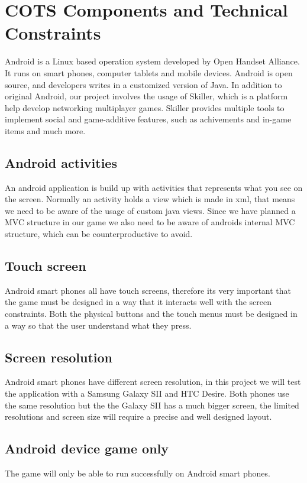 \section{COTS Components and Technical Constraints}
Android \cite{Android} is a Linux based operation system developed by Open Handset Alliance. It runs on smart phones, computer tablets and mobile devices. Android is open source, and developers writes in a customized version of Java\cite{sdk}. In addition to original Android, our project involves the usage of Skiller\cite{Skiller}, which is a platform help develop networking multiplayer games. Skiller provides multiple tools to implement social and game-additive features, such as achivements and in-game items and much more.

\subsection{Android activities}
An android application is build up with activities that represents what you see on the screen. Normally an activity holds a view which is made in xml, that means we need to be aware of the usage of custom java views. Since we have planned a MVC structure in our game we also need to be aware of androids internal MVC structure, which can be counterproductive to avoid.

\subsection{Touch screen}
Android smart phones all have touch screens, therefore its very important that the game must be designed in a way that it interacts well with the screen constraints. Both the physical buttons and the touch menus must be designed in a way so that the user understand what they press.

\subsection{Screen resolution}
Android smart phones have different screen resolution, in this project we will test the application with a Samsung Galaxy SII and HTC Desire. Both phones use the same resolution but the the Galaxy SII has a much bigger screen, the limited resolutions and screen size will require a precise and well designed layout.

\subsection{Android device game only}
The game will only be able to run successfully on Android smart phones.


